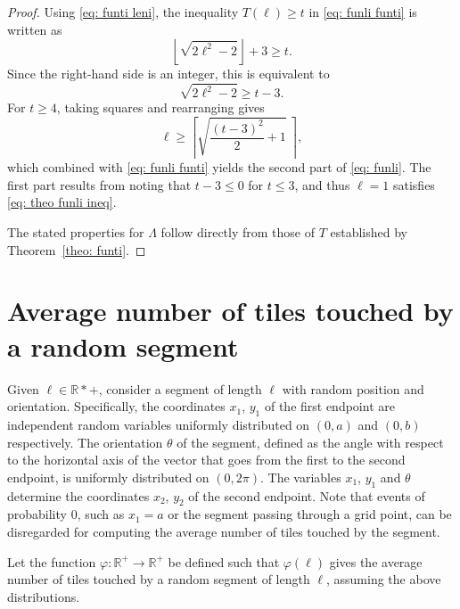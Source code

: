 \documentclass[12pt, a4paper]{article}
\newcommand{\funti}{T} %
\newcommand{\funli}{\Lambda} %
\newcommand{\funta}{\varphi} %
\newcommand{\len}{\ell} %
\newcommand{\leni}{\ell} %
\newcommand{\tiles}{t} %
\newcommand{\orient}{\theta}
\begin{document}
\begin{proof}
Using \eqref{eq: funti leni}, the inequality $\funti(\leni) \geq \tiles$ in \eqref{eq: funli funti} is written as
\begin{equation}
\left\lfloor \sqrt{2\leni^2-2} \right\rfloor + 3 \geq \tiles.
\end{equation}
Since the right-hand side is an integer, this is equivalent to
\begin{equation}
\label{eq: theo funli ineq}
\sqrt{2\leni^2-2} \geq \tiles-3.
\end{equation}
For $\tiles \geq 4$, taking squares and rearranging gives
\begin{equation}
\leni \geq \left \lceil \sqrt{\frac{(\tiles-3)^2} 2 + 1} \ \right \rceil,
\end{equation}
which combined with \eqref{eq: funli funti} yields the second part of \eqref{eq: funli}. The first part results from noting that $\tiles-3 \leq 0$ for $\tiles \leq 3$, and thus $\leni=1$ satisfies \eqref{eq: theo funli ineq}.

The stated properties for $\funli$ follow directly from those of $\funti$ established by Theorem~\ref{theo: funti}.
\end{proof}


\section{Average number of tiles touched by a random segment}
\label{part: ave}

Given $\len \in \mathbb R*+$, consider a segment of length $\len$ with random position and orientation. Specifically, the coordinates $x_1$, $y_1$ of the first endpoint are independent random variables uniformly distributed on $(0,a)$ and $(0,b)$ respectively. The orientation $\orient$ of the segment, defined as the angle with respect to the horizontal axis of the vector that goes from the first to the second endpoint, is uniformly distributed on $(0,2\pi)$. The variables $x_1$, $y_1$ and $\theta$ determine the coordinates $x_2$, $y_2$ of the second endpoint. Note that events of probability $0$, such as $x_1=a$ or the segment passing through a grid point, can be disregarded for computing the average number of tiles touched by the segment.

Let the function $\funta: \mathbb R^+ \to \mathbb R^+$ be defined such that $\funta(\len)$ gives the average number of tiles touched by a random segment of length $\len$, assuming the above distributions.
\end{document}
